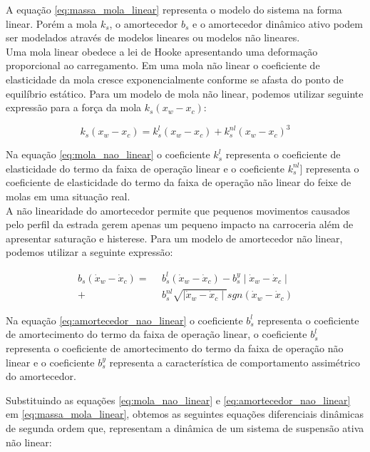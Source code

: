 A equação \ref{eq:massa_mola_linear} representa o modelo do sistema na forma linear. Porém a mola $k_s$, o amortecedor $b_s$ e o amortecedor dinâmico ativo podem ser modelados através de modelos lineares ou modelos não lineares. \\
Uma mola linear obedece a lei de Hooke apresentando uma deformação proporcional ao carregamento. Em uma mola não linear o coeficiente de elasticidade da mola cresce exponencialmente conforme se afasta do ponto de equilíbrio estático.
Para um modelo de mola não linear, podemos utilizar seguinte expressão para a força da mola $ k_{s}(x_{w}-x_{c})$:
    
\begin{equation} \label{eq:mola_nao_linear}
    k_{s}(x_{w}-x_{c}) = k^{l}_{s}(x_{w}-x_{c})+k^{nl}_{s}(x_{w}-x_{c})^{3}
\end{equation}
        
Na equação \ref{eq:mola_nao_linear} o coeficiente $k^{l}_{s}$ representa o coeficiente de elasticidade do termo da faixa de operação linear e o coeficiente $k^{nl}_{s}$] representa o coeficiente de elasticidade do termo da faixa de operação não linear do feixe de molas em uma situação real.\\
A não linearidade do amortecedor permite que pequenos movimentos causados pelo perfil da estrada gerem apenas um pequeno impacto na carroceria além de apresentar saturação e histerese. Para um modelo de amortecedor não linear, podemos utilizar a seguinte expressão:
 
\begin{equation} \label{eq:amortecedor_nao_linear}
    \begin{aligned}
        b_{s}(\dot{x}_{w}-\dot{x}_{c}) =\ \ &b^{l}_{s}(\dot{x}_{w}-\dot{x}_{c}) - b^{y}_{s}\mid\dot{x}_{w}-\dot{x}_{c}\mid \\
        + &b^{nl}_{s}\sqrt{\mid\dot{x}_{w}-\dot{x}_{c}\mid}sgn(\dot{x}_{w}-\dot{x}_{c})  
    \end{aligned}
\end{equation}
    
Na equação \ref{eq:amortecedor_nao_linear} o coeficiente $b^{l}_{s}$ representa o coeficiente de amortecimento do termo da faixa de operação linear, o coeficiente $b^{l}_{s}$ representa o coeficiente de amortecimento do termo da faixa de operação não linear e o coeficiente $b^{y}_{s}$ representa a característica de comportamento assimétrico do amortecedor.
    
Substituindo as equações \ref{eq:mola_nao_linear} e \ref{eq:amortecedor_nao_linear} em \ref{eq:massa_mola_linear}, obtemos as seguintes equações diferenciais dinâmicas de segunda ordem que, representam a dinâmica de um sistema de suspensão ativa não linear:
    
